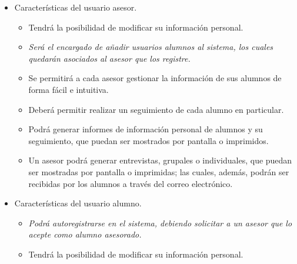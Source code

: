 \begin{itemize}
   \item Características del usuario asesor.
      \begin{itemize}
         \item Tendrá la posibilidad de modificar su información personal.
         \item \textit{Será el encargado de añadir usuarios alumnos al sistema,
         los cuales quedarán asociados al asesor que los registre.}
         \item Se permitirá a cada asesor gestionar la información de sus
         alumnos de forma fácil e intuitiva.
         \item Deberá permitir realizar un seguimiento de cada alumno en
         particular.
         \item Podrá generar informes de información personal de alumnos y su
         seguimiento, que puedan ser mostrados por pantalla o imprimidos.
         \item Un asesor podrá generar entrevistas, grupales o individuales, que
         puedan ser mostradas por pantalla o imprimidas; las cuales, además,
         podrán ser recibidas por los alumnos a través del correo electrónico.
      \end{itemize}

   \item Características del usuario alumno.
      \begin{itemize}
         \item \textit{Podrá autoregistrarse en el sistema, debiendo solicitar
         a un asesor que lo acepte como alumno asesorado.}
         \item Tendrá la posibilidad de modificar su información personal.
      \end{itemize}
\end{itemize}

